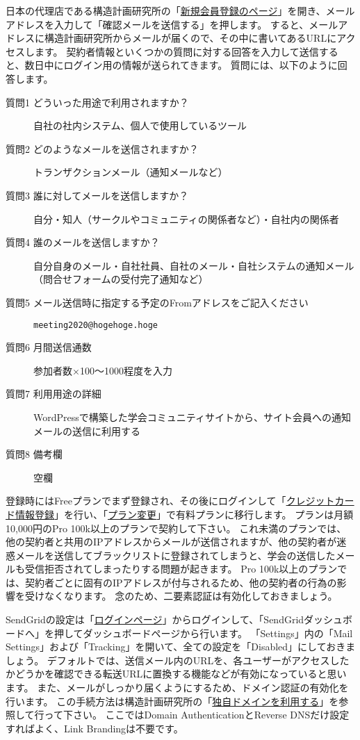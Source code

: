 \documentclass[titlepage,10pt,a4paper,uplatex]{jsbook}
\begin{document}
日本の代理店である構造計画研究所の「\href{https://sendgrid.kke.co.jp/app?p=signup.index}{新規会員登録のページ}」を開き、メールアドレスを入力して「確認メールを送信する」を押します。
すると、メールアドレスに構造計画研究所からメールが届くので、その中に書いてあるURLにアクセスします。
契約者情報といくつかの質問に対する回答を入力して送信すると、数日中にログイン用の情報が送られてきます。
質問には、以下のように回答します。

\begin{description}
\item[質問1 どういった用途で利用されますか？] 自社の社内システム、個人で使用しているツール
\item[質問2 どのようなメールを送信されますか？] トランザクションメール（通知メールなど）
\item[質問3 誰に対してメールを送信しますか？] 自分・知人（サークルやコミュニティの関係者など）・自社内の関係者
\item[質問4 誰のメールを送信しますか？] 自分自身のメール・自社社員、自社のメール・自社システムの通知メール（問合せフォームの受付完了通知など）
\item[質問5 メール送信時に指定する予定のFromアドレスをご記入ください] \texttt{meeting2020@hogehoge.hoge}
\item[質問6 月間送信通数] 参加者数×100～1000程度を入力
\item[質問7 利用用途の詳細] WordPressで構築した学会コミュニティサイトから、サイト会員への通知メールの送信に利用する
\item[質問8 備考欄] 空欄
\end{description}

登録時にはFreeプランでまず登録され、その後にログインして「\href{https://sendgrid.kke.co.jp/app?p=mypage.creditcard}{クレジットカード情報登録}」を行い、「\href{https://sendgrid.kke.co.jp/app?p=mypage.plan}{プラン変更}」で有料プランに移行します。
プランは月額10,000円のPro 100k以上のプランで契約して下さい。
これ未満のプランでは、他の契約者と共用のIPアドレスからメールが送信されますが、他の契約者が迷惑メールを送信してブラックリストに登録されてしまうと、学会の送信したメールも受信拒否されてしまったりする問題が起きます。
Pro 100k以上のプランでは、契約者ごとに固有のIPアドレスが付与されるため、他の契約者の行為の影響を受けなくなります。
念のため、二要素認証は有効化しておきましょう。

SendGridの設定は「\href{https://sendgrid.kke.co.jp/app?p=login.index}{ログインページ}」からログインして、「SendGridダッシュボードへ」を押してダッシュボードページから行います。
「Settings」内の「Mail Settings」および「Tracking」を開いて、全ての設定を「Disabled」にしておきましょう。
デフォルトでは、送信メール内のURLを、各ユーザーがアクセスしたかどうかを確認できる転送URLに置換する機能などが有効になっていると思います。
また、メールがしっかり届くようにするため、ドメイン認証の有効化を行います。
この手続方法は構造計画研究所の「\href{https://sendgrid.kke.co.jp/docs/Tutorials/D_Improve_Deliverability/using_whitelabel.html}{独自ドメインを利用する}」を参照して行って下さい。
ここではDomain AuthenticationとReverse DNSだけ設定すればよく、Link Brandingは不要です。
\end{document}
